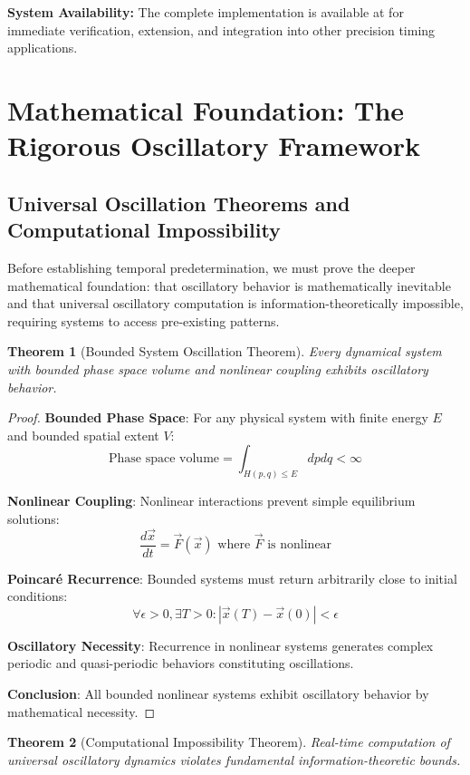 \documentclass[12pt,a4paper]{article}
\newtheorem{theorem}{Theorem}[section]
\begin{document}
\textbf{System Availability:} The complete implementation is available at \cite{stella-lorraine-implementation} for immediate verification, extension, and integration into other precision timing applications.

\section{Mathematical Foundation: The Rigorous Oscillatory Framework}

\subsection{Universal Oscillation Theorems and Computational Impossibility}

Before establishing temporal predetermination, we must prove the deeper mathematical foundation: that oscillatory behavior is mathematically inevitable and that universal oscillatory computation is information-theoretically impossible, requiring systems to access pre-existing patterns.

\begin{theorem}[Bounded System Oscillation Theorem]
Every dynamical system with bounded phase space volume and nonlinear coupling exhibits oscillatory behavior.
\end{theorem}

\begin{proof}
\textbf{Bounded Phase Space}: For any physical system with finite energy $E$ and bounded spatial extent $V$:
$$\text{Phase space volume} = \int_{H(p,q) \leq E} dp dq < \infty$$

\textbf{Nonlinear Coupling}: Nonlinear interactions prevent simple equilibrium solutions:
$$\frac{d\vec{x}}{dt} = \vec{F}(\vec{x}) \text{ where } \vec{F} \text{ is nonlinear}$$

\textbf{Poincaré Recurrence}: Bounded systems must return arbitrarily close to initial conditions:
$$\forall \epsilon > 0, \exists T > 0: |\vec{x}(T) - \vec{x}(0)| < \epsilon$$

\textbf{Oscillatory Necessity}: Recurrence in nonlinear systems generates complex periodic and quasi-periodic behaviors constituting oscillations.

\textbf{Conclusion}: All bounded nonlinear systems exhibit oscillatory behavior by mathematical necessity.
\end{proof}

\begin{theorem}[Computational Impossibility Theorem]
Real-time computation of universal oscillatory dynamics violates fundamental information-theoretic bounds.
\end{theorem}
\end{document}
